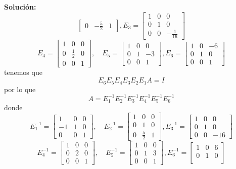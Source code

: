 \documentclass[12pt]{article}
\newenvironment{solucion}
{\begin{mdframed}[backgroundcolor=black!10]
		{\bf Solución:}\\
	}
	{
	\end{mdframed}
}
\newenvironment{preguntas}
{\begin{enumerate}\itemsep12pt
	}
	{
	\end{enumerate}
}
\begin{document}
\begin{preguntas}
\begin{solucion}
$$\begin{bmatrix}
		0 & -\frac{5}{2} & 1
		\end{bmatrix}, E_3 = \begin{bmatrix}
		1 & 0 & 0\\
		0 & 1 & 0\\
		0 & 0 & -\frac{1}{16}
		\end{bmatrix}$$
		$$E_4 = \begin{bmatrix}
		1 & 0 & 0\\
		0 & \frac{1}{2} & 0\\
		0 & 0 & 1
		\end{bmatrix}, \quad E_5 = \begin{bmatrix}
		1 & 0 & 0\\
		0 & 1 & -3\\
		0 & 0 & 1
		\end{bmatrix}, E_6 = \begin{bmatrix}
		1 & 0 & -6\\
		0 & 1 & 0\\
		0 & 0 & 1
		\end{bmatrix}$$
		tenemos que
		$$E_6E_5E_4E_3E_2E_1A = I$$
		por lo que
		$$A = E_1^{-1}E_2^{-1}E_3^{-1}E_4^{-1}E_5^{-1}E_6^{-1}$$
		donde
		$$E_1^{-1} = \begin{bmatrix}
		1 & 0 & 0\\
		-1 & 1 & 0\\
		0 & 0 & 1
		\end{bmatrix}, \quad E_2^{-1} = \begin{bmatrix}
		1 & 0 & 0\\
		0 & 1 & 0\\
		0 & \frac{5}{2} & 1
		\end{bmatrix}, E_3^{-1} = \begin{bmatrix}
		1 & 0 & 0\\
		0 & 1 & 0\\
		0 & 0 & -16
		\end{bmatrix}$$
		$$E_4^{-1} = \begin{bmatrix}
		1 & 0 & 0\\
		0 & 2 & 0\\
		0 & 0 & 1
		\end{bmatrix}, \quad E_5^{-1} = \begin{bmatrix}
		1 & 0 & 0\\
		0 & 1 & 3\\
		0 & 0 & 1
		\end{bmatrix}, E_6^{-1} = \begin{bmatrix}
		1 & 0 & 6\\
		0 & 1 & 0\\

\end{bmatrix}$$
\end{solucion}
\end{preguntas}
\end{document}
